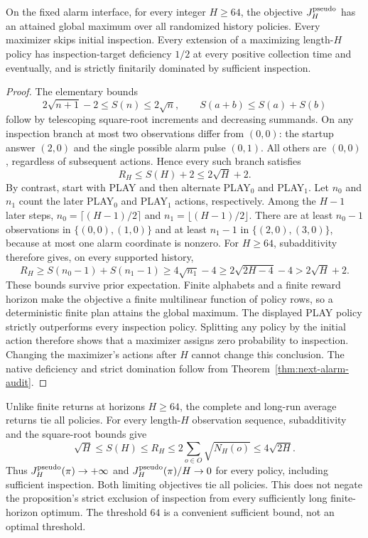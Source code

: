 \begin{proposition}\label{prop:alarm-pseudocount}
On the fixed alarm interface, for every integer $H\ge64$, the objective
$J_H^{\rm pseudo}$ has an attained global maximum over all randomized history
policies. Every maximizer skips initial inspection. Every extension of a maximizing
length-$H$ policy has inspection-target deficiency $1/2$ at every positive collection
time and eventually, and is strictly finitarily dominated by sufficient inspection.
\end{proposition}
\begin{proof}
The elementary bounds
\[
 2\sqrt{n+1}-2\le S(n)\le2\sqrt n,\qquad S(a+b)\le S(a)+S(b)
\]
follow by telescoping square-root increments and decreasing summands.
On any inspection branch at most two observations differ from $(0,0)$: the startup
answer $(2,0)$ and the single possible alarm pulse $(0,1)$. All others are $(0,0)$,
regardless of subsequent actions. Hence every such branch satisfies
\[
 R_H\le S(H)+2\le2\sqrt H+2.
\]
By contrast, start with PLAY and then alternate PLAY$_0$ and PLAY$_1$.
Let $n_0$ and $n_1$ count the later PLAY$_0$ and PLAY$_1$ actions, respectively.
Among the $H-1$ later steps, $n_0=\lceil(H-1)/2\rceil$ and
$n_1=\lfloor(H-1)/2\rfloor$. There are at least $n_0-1$ observations in
$\{(0,0),(1,0)\}$ and at least $n_1-1$ in
$\{(2,0),(3,0)\}$, because at most one alarm coordinate is nonzero.
For $H\ge64$, subadditivity therefore gives, on every supported history,
\[
 R_H\ge S(n_0-1)+S(n_1-1)\ge4\sqrt{n_1}-4
 \ge2\sqrt{2H-4}-4>2\sqrt H+2.
\]
These bounds survive prior expectation. Finite alphabets and a finite reward horizon
make the objective a finite multilinear function of policy rows, so a deterministic
finite plan attains the global maximum. The displayed PLAY policy strictly outperforms
every inspection policy. Splitting any policy by the initial action therefore shows
that a maximizer assigns zero probability to inspection. Changing the maximizer's actions after
$H$ cannot change this conclusion. The native deficiency and strict domination follow
from Theorem~\ref{thm:next-alarm-audit}.
\end{proof}

Unlike finite returns at horizons $H\ge64$, the complete and long-run average
returns tie all policies. For every
length-$H$ observation sequence, subadditivity and the square-root bounds give
\[
 \sqrt H\le S(H)\le R_H\le2\sum_{o\in O}\sqrt{N_H(o)}\le4\sqrt{2H}.
\]
Thus $J_H^{\rm pseudo}(\pi)\to+\infty$ and
$J_H^{\rm pseudo}(\pi)/H\to0$ for every policy, including sufficient inspection.
Both limiting objectives tie all policies. This does not negate the proposition's
strict exclusion of inspection from every sufficiently long finite-horizon optimum.
The threshold $64$ is a convenient sufficient bound, not an optimal threshold.

